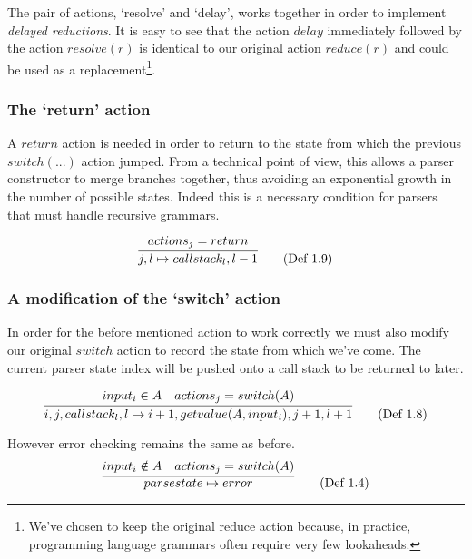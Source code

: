 \documentclass[a4paper,11pt]{article}
\begin{document}
The pair of actions, `resolve' and `delay', works together in order to implement \emph{delayed reductions}. 
It is easy to see that the action $delay$ immediately followed by the action $resolve(r)$ is identical to our original action $reduce(r)$ and could be used as a replacement\footnote{We've chosen to keep the original reduce action because, in practice, programming language grammars often require very few lookaheads.}.

\subsubsection{The `return' action}
A $return$ action is needed in order to return to the state from which the previous $switch(...)$ action jumped. 
From a technical point of view, this allows a parser constructor to merge branches together, thus avoiding an exponential growth in the number of possible states. 
Indeed this is a necessary condition for parsers that must handle recursive grammars.

\begin{equation}
\infer{j, l \mapsto callstack_l, l-1}{actions_j = return} \tag{Def 1.9}
\end{equation}

\subsubsection{A modification of the `switch' action}
In order for the before mentioned action to work correctly we must also modify our original $switch$ action to record the state from which we've come.
The current parser state index will be pushed onto a call stack to be returned to later.

\begin{equation}
\infer{i, j, callstack_l, l \mapsto i+1, getvalue(A, input_i), j+1, l+1}{input_i \in A & actions_j = switch(A)} \tag{Def 1.8}
\end{equation}

However error checking remains the same as before.
\begin{equation}
\infer{parsestate \mapsto error}{input_i \notin A & actions_j = switch(A)} \tag{Def 1.4}
\end{equation}
\end{document}
